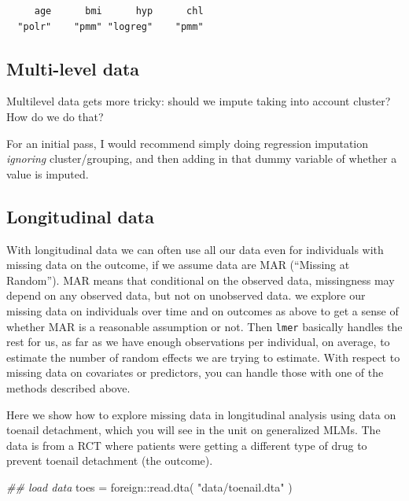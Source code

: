 \documentclass[
  letterpaper,
  DIV=11,
  numbers=noendperiod]{scrreprt}
\newenvironment{Shaded}{\begin{snugshade}}{\end{snugshade}}
\newcommand{\DocumentationTok}[1]{\textcolor[rgb]{0.73,0.13,0.13}{\textit{#1}}}
\newcommand{\FunctionTok}[1]{\textcolor[rgb]{0.02,0.16,0.49}{#1}}
\newcommand{\NormalTok}[1]{\textcolor[rgb]{0.00,0.44,0.13}{#1}}
\newcommand{\OtherTok}[1]{\textcolor[rgb]{0.00,0.44,0.13}{#1}}
\newcommand{\SpecialCharTok}[1]{\textcolor[rgb]{0.25,0.44,0.63}{#1}}
\newcommand{\StringTok}[1]{\textcolor[rgb]{0.25,0.44,0.63}{#1}}
\begin{document}
\begin{verbatim}
     age      bmi      hyp      chl 
  "polr"    "pmm" "logreg"    "pmm" 
\end{verbatim}

\hypertarget{multi-level-data}{%
\subsection{Multi-level data}\label{multi-level-data}}

Multilevel data gets more tricky: should we impute taking into account
cluster? How do we do that?

For an initial pass, I would recommend simply doing regression
imputation \emph{ignoring} cluster/grouping, and then adding in that
dummy variable of whether a value is imputed.

\hypertarget{longitudinal-data}{%
\subsection{Longitudinal data}\label{longitudinal-data}}

With longitudinal data we can often use all our data even for
individuals with missing data on the outcome, if we assume data are MAR
(``Missing at Random''). MAR means that conditional on the observed
data, missingness may depend on any observed data, but not on unobserved
data. we explore our missing data on individuals over time and on
outcomes as above to get a sense of whether MAR is a reasonable
assumption or not. Then \texttt{lmer} basically handles the rest for us,
as far as we have enough observations per individual, on average, to
estimate the number of random effects we are trying to estimate. With
respect to missing data on covariates or predictors, you can handle
those with one of the methods described above.

Here we show how to explore missing data in longitudinal analysis using
data on toenail detachment, which you will see in the unit on
generalized MLMs. The data is from a RCT where patients were getting a
different type of drug to prevent toenail detachment (the outcome).

\begin{Shaded}
\begin{Highlighting}[]
\DocumentationTok{\#\# load data}
\NormalTok{  toes }\OtherTok{=}\NormalTok{ foreign}\SpecialCharTok{::}\FunctionTok{read.dta}\NormalTok{( }\StringTok{"data/toenail.dta"}\NormalTok{ )}
\end{Highlighting}
\end{Shaded}
\end{document}
